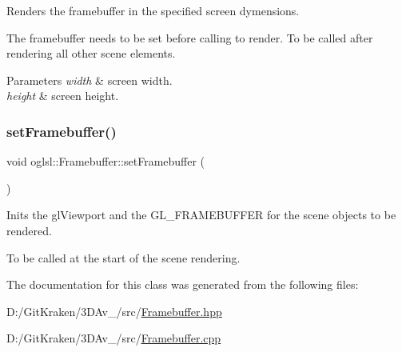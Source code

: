 Renders the framebuffer in the specified screen dymensions. 

The framebuffer needs to be set before calling to render. To be called after rendering all other scene elements. 
\begin{DoxyParams}{Parameters}
{\em width} & screen width. \\
\hline
{\em height} & screen height. \\
\hline
\end{DoxyParams}
\mbox{\label{classoglsl_1_1_framebuffer_a3e0f4248aed96f483a318b34ea8c9cb8}} 
\subsubsection{\texorpdfstring{set\+Framebuffer()}{setFramebuffer()}}
{\footnotesize\ttfamily void oglsl\+::\+Framebuffer\+::set\+Framebuffer (\begin{DoxyParamCaption}{ }\end{DoxyParamCaption})}



Inits the gl\+Viewport and the G\+L\+\_\+\+F\+R\+A\+M\+E\+B\+U\+F\+F\+ER for the scene objects to be rendered. 

To be called at the start of the scene rendering. 

The documentation for this class was generated from the following files\+:\begin{DoxyCompactItemize}
\item 
D\+:/\+Git\+Kraken/3\+D\+Av\+\_/src/\mbox{\hyperlink{_framebuffer_8hpp}{Framebuffer.\+hpp}}\item 
D\+:/\+Git\+Kraken/3\+D\+Av\+\_/src/\mbox{\hyperlink{_framebuffer_8cpp}{Framebuffer.\+cpp}}\end{DoxyCompactItemize}
